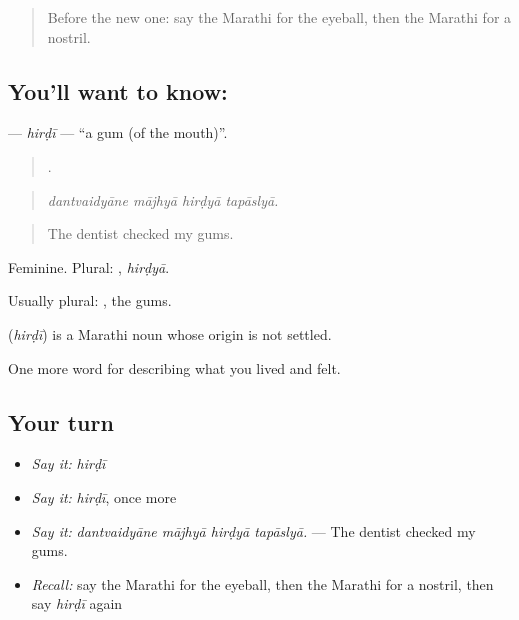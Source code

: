 \label{lesson:MR-C476-hirdi}



\begin{quote}
Before the new one: say the Marathi for the eyeball, then the Marathi for a nostril.
\end{quote}

\subsection*{You'll want to know: }
\textbf{} — \emph{hirḍī} — \textquotedblleft{}a gum (of the mouth)\textquotedblright{}.

\begin{quote}
   .
\end{quote}

\begin{quote}
\emph{dantvaidyāne mājhyā hirḍyā tapāslyā.}
\end{quote}

\begin{quote}
The dentist checked my gums.
\end{quote}

Feminine. Plural: , \emph{hirḍyā}.

Usually plural: , the gums.

\begin{cousinweb}
\textbf{} (\emph{hirḍī}) is a Marathi noun whose origin is not settled.
\end{cousinweb}

\begin{grammarlens}[title={What you've built}]
One more word for describing what you lived and felt.
\end{grammarlens}

\subsection*{Your turn}
\begin{itemize}
\raggedright
  \item \emph{Say it:} \emph{hirḍī}
  \item \emph{Say it:} \emph{hirḍī}, once more
  \item \emph{Say it:} \emph{dantvaidyāne mājhyā hirḍyā tapāslyā.} — The dentist checked my gums.
  \item \emph{Recall:} say the Marathi for the eyeball, then the Marathi for a nostril, then say \emph{hirḍī} again
\end{itemize}


